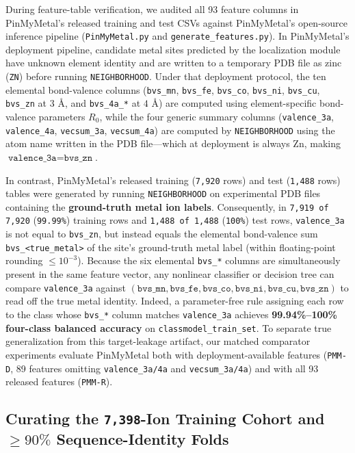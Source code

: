 \documentclass[10pt,a4paper,twocolumn]{article}
\begin{document}
During feature-table verification, we audited all 93 feature columns in PinMyMetal's released training and test CSVs against PinMyMetal's open-source inference pipeline (\texttt{PinMyMetal.py} and \texttt{generate\_features.py}). In PinMyMetal's deployment pipeline, candidate metal sites predicted by the localization module have unknown element identity and are written to a temporary PDB file as zinc (\texttt{ZN}) before running \texttt{NEIGHBORHOOD}. Under that deployment protocol, the ten elemental bond-valence columns (\texttt{bvs\_mn}, \texttt{bvs\_fe}, \texttt{bvs\_co}, \texttt{bvs\_ni}, \texttt{bvs\_cu}, \texttt{bvs\_zn} at $3\text{ \AA}$, and \texttt{bvs\_4a\_*} at $4\text{ \AA}$) are computed using element-specific bond-valence parameters $R_0$, while the four generic summary columns (\texttt{valence\_3a}, \texttt{valence\_4a}, \texttt{vecsum\_3a}, \texttt{vecsum\_4a}) are computed by \texttt{NEIGHBORHOOD} using the atom name written in the PDB file---which at deployment is always $\text{Zn}$, making $\texttt{valence\_3a} = \texttt{bvs\_zn}$.

In contrast, PinMyMetal's released training (\texttt{7,920} rows) and test (\texttt{1,488} rows) tables were generated by running \texttt{NEIGHBORHOOD} on experimental PDB files containing the \textbf{ground-truth metal ion labels}. Consequently, in \texttt{7,919 of 7,920} (\texttt{99.99\%}) training rows and \texttt{1,488 of 1,488} (\texttt{100\%}) test rows, \texttt{valence\_3a} is not equal to \texttt{bvs\_zn}, but instead equals the elemental bond-valence sum \texttt{bvs\_<true\_metal>} of the site's ground-truth metal label (within floating-point rounding $\le 10^{-3}$). Because the six elemental \texttt{bvs\_*} columns are simultaneously present in the same feature vector, any nonlinear classifier or decision tree can compare \texttt{valence\_3a} against $(\texttt{bvs\_mn}, \texttt{bvs\_fe}, \texttt{bvs\_co}, \texttt{bvs\_ni}, \texttt{bvs\_cu}, \texttt{bvs\_zn})$ to read off the true metal identity. Indeed, a parameter-free rule assigning each row to the class whose \texttt{bvs\_*} column matches \texttt{valence\_3a} achieves \textbf{99.94\%--100\% four-class balanced accuracy} on \texttt{classmodel\_train\_set}. To separate true generalization from this target-leakage artifact, our matched comparator experiments evaluate PinMyMetal both with deployment-available features (\texttt{PMM-D}, 89 features omitting \texttt{valence\_3a/4a} and \texttt{vecsum\_3a/4a}) and with all 93 released features (\texttt{PMM-R}).

\subsection{Curating the \texttt{7,398}-Ion Training Cohort and $\ge 90\%$ Sequence-Identity Folds}
\end{document}
